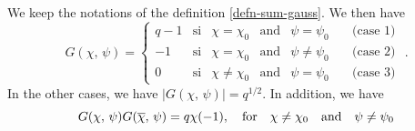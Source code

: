  
\begin{prop}
\label{prop-calcul-sums-gauss}
We keep the notations of the definition \ref{defn-sum-gauss}. We then have
\begin{equation*}
G (\chi, \, \psi) = \left\{\begin{array}{llllll} q-1 & \text{si} & \chi = \chi_0 & \text{and} & \psi = \psi_0 & \quad \text{(case 1)} \\-1 & \text{si} & \chi = \chi_0 & \text{and} & \psi \neq \psi_0 & \quad \text{(case 2) } \\0 & \text{si} & \chi \neq \chi_0 & \text{and} & \psi = \psi_0 & \quad \text{(case 3)} \end{array} \right. .
\end{equation*}
In the other cases, we have $ | G (\chi, \, \psi) | = q^{1/2} $. In addition, we have
\begin{equation}
\label{eq-prop-ptes-sums-gauss-iv}
G (\chi, \, \psi) G (\overline{\chi}, \, \psi) = q \chi (-1), \quad \text{for} \quad \chi \neq \chi_0 \quad \text{and} \quad \psi \neq \psi_0
\end{equation}
\end{prop}

